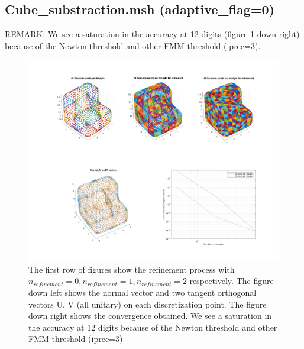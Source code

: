 \documentclass[11pt, oneside]{article}   	%
\begin{document}
\newpage
\subsection{Cube\_substraction.msh (adaptive\_flag=0)}
REMARK: We see a saturation in the accuracy at 12 digits (figure \ref{cube_substraction} down right) because of the Newton threshold and other FMM threshold (iprec=3).

\begin{figure}[H]
\begin{center}
\includegraphics[width=6in]{cube_substraction.pdf}
\end{center}
\caption{The first row of figures show the refinement process with $n_{refinement}=0, n_{refinement}=1, n_{refinement}=2$ respectively.
The figure down left shows the normal vector and two tangent orthogonal vectors U, V (all unitary) on each discretization point. The figure down right shows the convergence obtained. We see a saturation in the accuracy at 12 digits because of the Newton threshold and other FMM threshold (iprec=3)}
\label{cube_substraction}
\end{figure}
\end{document}
